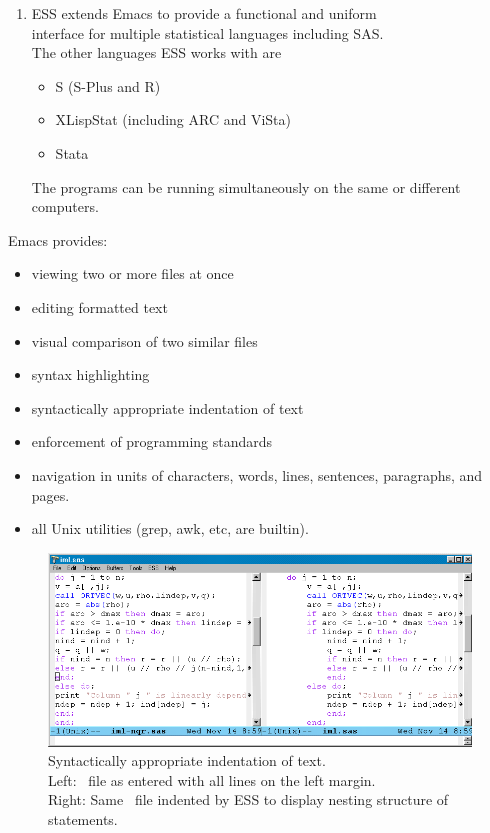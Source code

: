 \begin{enumerate}
\newpage
\item
ESS extends Emacs to provide a functional and uniform\\
interface for
multiple statistical languages including SAS.\\[1ex]
%
The other languages ESS works with are
\setlength{\topsep}{1ex}
\begin{itemize}
\setlength{\itemsep}{1ex}
\item S (S-Plus and R)
\item XLispStat (including ARC and ViSta)
\item Stata
\end{itemize}
%
The programs can be running simultaneously on the same or different
computers.
\end{enumerate}
\newpage

Emacs provides:
\begin{itemize}
\setlength{\itemsep}{1ex}
\item viewing two or more files at once
\item editing formatted text
\item visual comparison of two similar files
\item syntax highlighting
\item syntactically appropriate indentation of text
\item enforcement of programming standards
\item navigation in units of
characters, words, lines, sentences, paragraphs, and pages.
\item all Unix utilities (grep, awk, etc, are builtin).
\end{itemize}


\begin{figure}[tbp]
  \includegraphics[angle=0,width=9.5in,natwidth=842,natheight=385]{Image5.png}
  \caption[]{Syntactically appropriate indentation of text.\\
Left: \SAS\ file as entered with all lines on the left margin.\\
Right: Same \SAS\ file indented by ESS to display nesting structure of statements.}
  \label{Image5}
\end{figure}

